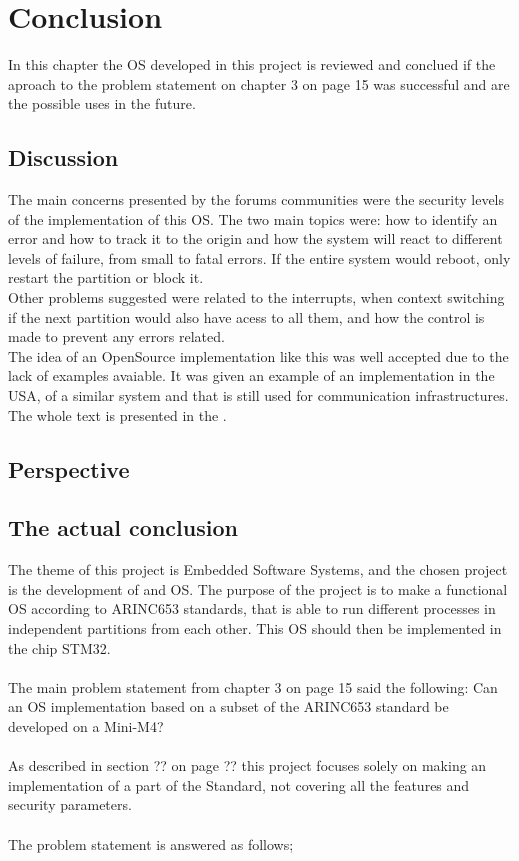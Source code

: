 \chapter{Conclusion}\label{ch:conclusion}

In this chapter the OS developed in this project is reviewed and conclued if the aproach to the problem 
statement on chapter 3 on page 15 was successful and are the possible uses in the future.\\

\section{Discussion}
The main concerns presented by the forums communities were the security levels of the implementation of 
this OS. The two main topics were: how to identify an error and how to track it to the origin and how the 
system will react to different levels of failure, from small to fatal errors. If the entire system would 
reboot, only restart the partition or block it.\\
Other problems suggested were related to the interrupts, when context switching if the next partition 
would also have acess to all them, and how the control is made to prevent any errors related.\\
The idea of an OpenSource implementation like this was well accepted due to the lack of examples avaiable. 
It was given an example of an implementation in the USA, of a similar system and that is still used for
communication infrastructures.
The whole text is presented in the .

\section{Perspective}



\section{The actual conclusion}
The theme of this project is Embedded Software Systems, and the chosen project is the development of and 
OS. The purpose of the project is to make a functional OS according to ARINC653 standards, that is able to 
run different processes in independent partitions from each other. This OS should then be implemented in 
the chip STM32.\\
\\
The main problem statement from chapter 3 on page 15 said the following: Can an OS implementation based on 
a subset of the ARINC653 standard be developed on a Mini-M4?\\
\\
As described in section ?? on page ?? this project focuses solely on making an
implementation of a part of the Standard, not covering all the features and security parameters.\\
\\
The problem statement is answered as follows;\\
